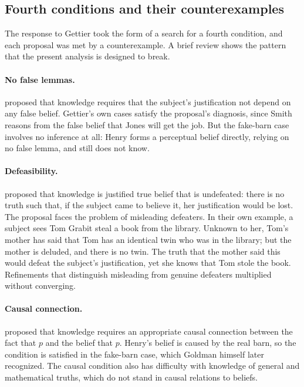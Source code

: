 \documentclass{situationist-preprint}
\begin{document}
\subsection{Fourth conditions and their counterexamples}

The response to Gettier took the form of a search for a fourth condition, and each proposal was met by a counterexample. A brief review shows the pattern that the present analysis is designed to break.

\paragraph{No false lemmas.} \citet{Clark1963} proposed that knowledge requires that the subject's justification not depend on any false belief. Gettier's own cases satisfy the proposal's diagnosis, since Smith reasons from the false belief that Jones will get the job. But the fake-barn case \citep{Goldman1976} involves no inference at all: Henry forms a perceptual belief directly, relying on no false lemma, and still does not know.

\paragraph{Defeasibility.} \citet{LehrerPaxson1969} proposed that knowledge is justified true belief that is undefeated: there is no truth such that, if the subject came to believe it, her justification would be lost. The proposal faces the problem of misleading defeaters. In their own example, a subject sees Tom Grabit steal a book from the library. Unknown to her, Tom's mother has said that Tom has an identical twin who was in the library; but the mother is deluded, and there is no twin. The truth that the mother said this would defeat the subject's justification, yet she knows that Tom stole the book. Refinements that distinguish misleading from genuine defeaters multiplied without converging.

\paragraph{Causal connection.} \citet{Goldman1967} proposed that knowledge requires an appropriate causal connection between the fact that $p$ and the belief that $p$. Henry's belief is caused by the real barn, so the condition is satisfied in the fake-barn case, which Goldman himself later recognized. The causal condition also has difficulty with knowledge of general and mathematical truths, which do not stand in causal relations to beliefs.
\end{document}
